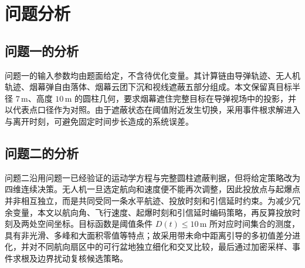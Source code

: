 \section{问题分析}

\subsection{问题一的分析}

问题一的输入参数均由题面给定，不含待优化变量。其计算链由导弹轨迹、无人机轨迹、烟幕弹自由落体、烟幕云团下沉和视线遮蔽五部分组成。本文保留真目标半径 $7\,\mathrm{m}$、高度 $10\,\mathrm{m}$ 的圆柱几何，要求烟幕遮住完整目标在导弹视场中的投影，并以代表点口径作为对照。由于遮蔽状态在阈值附近发生切换，采用事件根求解进入与离开时刻，可避免固定时间步长造成的系统误差。
\subsection{问题二的分析}

问题二沿用问题一已经验证的运动学方程与完整圆柱遮蔽判据，但将给定策略改为四维连续决策。无人机一旦选定航向和速度便不能再次调整，因此投放点与起爆点并非相互独立，而是共同受同一条水平航迹、投放时刻和引信延时约束。为减少冗余变量，本文以航向角、飞行速度、起爆时刻和引信延时编码策略，再反算投放时刻及两处空间坐标。目标函数是阈值条件 $D(t)\le 10\,\mathrm{m}$ 所对应时间集合的测度，具有非光滑、多峰和大面积零值等特点；故采用带未命中距离引导的多初值差分进化，并对不同航向扇区中的可行盆地独立细化和交叉比较，最后通过加密采样、事件求根及边界扰动复核候选策略。

\endinput

\section{模板的基本使用}

\subsection{LaTeX 发行版和编辑器安装}

要用 \LaTeX{} 来完成建模论文，首先要确保正确安装一个 \LaTeX{} 的发行版本。

\begin{itemize}
    \item Mac 下可用 Mac\TeX{}
    \item Linux 下可用 \TeX{}Live ；
    \item windows 下可用 \TeX{}Live 或 Mik\TeX{} ;
\end{itemize}

